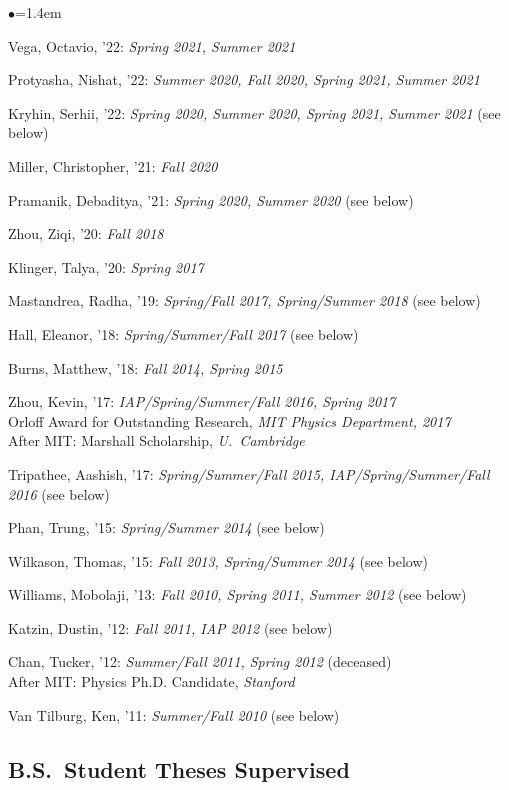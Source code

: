 \documentclass[11pt]{article}
\newcommand{\heading}[1]{\vspace{0in}\subsection*{#1} \vspace{.02in}}
\newcommand{\sh}{\phantom{.....}}
\newcommand{\bbl}{\begin{list}{$\bullet$}{\leftmargin=1.4em \itemsep=-1pt}}
\newcommand{\el}{\end{list}}
\begin{document}
\bbl
\item Vega, Octavio, '22:  \textit{Spring 2021, Summer 2021}
\item Protyasha, Nishat, '22:  \textit{Summer 2020, Fall 2020, Spring 2021, Summer 2021}
\item Kryhin, Serhii, '22:   \textit{Spring 2020, Summer 2020, Spring 2021, Summer 2021} (see below)
\item Miller, Christopher, '21:  \textit{Fall 2020}
\item Pramanik, Debaditya, '21:  \textit{Spring 2020, Summer 2020} (see below)
\item Zhou, Ziqi, '20:  \textit{Fall 2018}
\item Klinger, Talya, '20:  \textit{Spring 2017}
\item Mastandrea, Radha, '19:  \textit{Spring/Fall 2017, Spring/Summer 2018} (see below)
\item Hall, Eleanor, '18:  \textit{Spring/Summer/Fall 2017} (see below)
\item Burns, Matthew, '18:  \textit{Fall 2014, Spring 2015}
\item Zhou, Kevin, '17:  \textit{IAP/Spring/Summer/Fall 2016, Spring 2017}
\\ \sh Orloff Award for Outstanding Research, \textit{MIT Physics Department, 2017}
\\ \sh After MIT:  Marshall Scholarship, \textit{U.~Cambridge}
\item Tripathee, Aashish, '17: \textit{Spring/Summer/Fall 2015, IAP/Spring/Summer/Fall 2016} (see below)
\item Phan, Trung, '15: \textit{Spring/Summer 2014} (see below)
\item Wilkason, Thomas, '15: \textit{Fall 2013, Spring/Summer 2014} (see below)
\item Williams, Mobolaji, '13: \textit{Fall 2010, Spring 2011, Summer 2012} (see below)
\item Katzin, Dustin, '12: \textit{Fall 2011, IAP 2012} (see below)
\item Chan, Tucker, '12: \textit{Summer/Fall 2011, Spring 2012}  (deceased)
\\ \sh After MIT:   Physics Ph.D. Candidate, \textit{Stanford}
\item Van Tilburg, Ken, '11:  \textit{Summer/Fall 2010} (see below)
\el


\heading{B.S.\ Student Theses Supervised}
\end{document}
